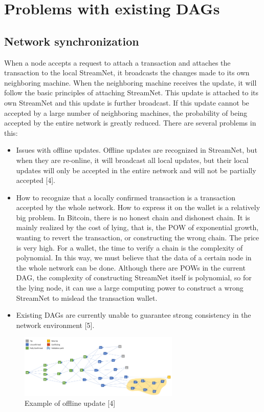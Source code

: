 \section{Problems with existing DAGs}
\subsection{Network synchronization}
When a node accepts a request to attach a transaction and attaches the transaction to the local StreamNet, it broadcasts the changes made to its own neighboring machine. When the neighboring machine receives the update, it will follow the basic principles of attaching StreamNet. This update is attached to its own StreamNet and this update is further broadcast. If this update cannot be accepted by a large number of neighboring machines, the probability of being accepted by the entire network is greatly reduced. There are several problems in this:
\begin{itemize}
	\item Issues with offline updates. Offline updates are recognized in StreamNet, but when they are re-online, it will broadcast all local updates, but their local updates will only be accepted in the entire network and will not be partially accepted [4].
	\item How to recognize that a locally confirmed transaction is a transaction accepted by the whole network. How to express it on the wallet is a relatively big problem. In Bitcoin, there is no honest chain and dishonest chain. It is mainly realized by the cost of lying, that is, the POW of exponential growth, wanting to revert the transaction, or constructing the wrong chain. The price is very high. For a wallet, the time to verify a chain is the complexity of polynomial. In this way, we must believe that the data of a certain node in the whole network can be done. Although there are POWs in the current DAG, the complexity of constructing StreamNet itself is polynomial, so for the lying node, it can use a large computing power to construct a wrong StreamNet to mislead the transaction wallet.
	\item Existing DAGs are currently unable to guarantee strong consistency in the network environment [5].
\end{itemize}

\begin{figure}[H]
	\centering
	\includegraphics[width=3.0in]{figures/screenshot013.png}
	\caption{Example of offline update [4]}
	\label{simulationfigure}
\end{figure}

